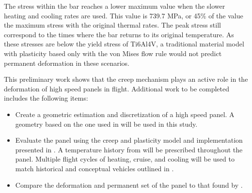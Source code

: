 \documentclass[conf]{new-aiaa}
\begin{document}

The stress within the bar reaches a lower maximum value 
when the slower heating and cooling rates are used.
This value is 739.7 MPa, or 45\% of the value
the maximum stress with the original thermal rates.
The peak stress still correspond to the times where
the bar returns to its original temperature.
As these stresses are below the yield stress of Ti6Al4V, 
a traditional material model with plasticity based only with the
von Mises flow rule would not predict permanent deformation 
in these scenarios.


This preliminary work shows that the creep mechanism plays 
an active role in the deformation of high speed panels in flight.
Additional work to be completed includes the following items:

\begin{itemize}
  \item Create a geometric estimation and discretization of a high speed panel.
        A geometry based on the one used in 
        \cite{ culler_impact_of_FTS_coupling_on_response_prediction_hypersonic_skin_panels}
        will be used in this study.
  \item Evaluate the panel using the creep and plasticity model and implementation presented in
        \cite{ li_simulation_of_finite_strain_inelastic_phenomena_governed_by_creep_and_plasticity}.
        A temperature history from 
        \cite{ culler_impact_of_FTS_coupling_on_response_prediction_hypersonic_skin_panels}
        will be prescribed throughout the panel. 
        Multiple flight cycles of heating, cruise, and cooling will be used
        to match historical and conceptual vehicles outlined in
        \cite{ kordes_structureal_heating_experiencs_on_the_x15_airplane,
               zuchowski_AVIATR_Predictive_capability_for_hypersonic_structural_response_and_life_prediction_phase_II}.
  \item Compare the deformation and permanent set of the panel to that 
        found by \cite{ culler_impact_of_FTS_coupling_on_response_prediction_hypersonic_skin_panels}.
\end{itemize}
\end{document}

